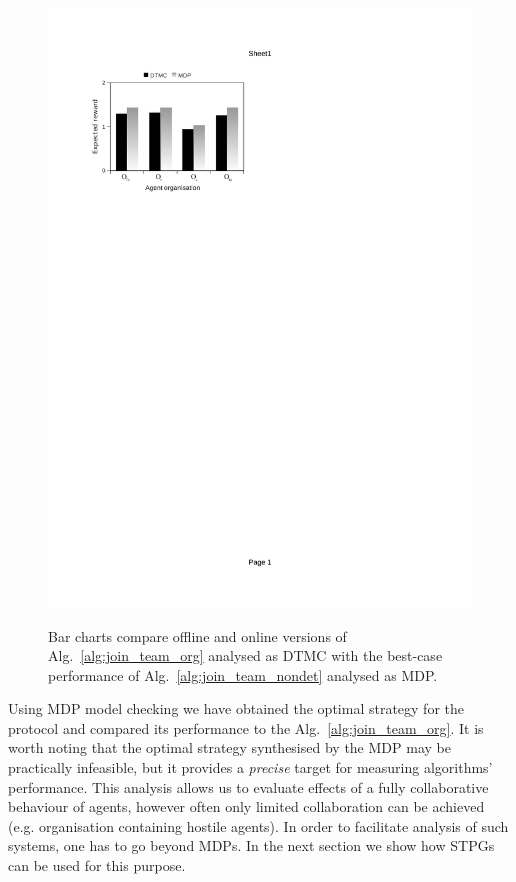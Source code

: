 \documentclass{llncs}
\begin{document}
\begin{figure}[H]
{{\includegraphics[clip=true, trim=63 581.5 320 80, scale=0.77]{images/w2_mdp_online}
}}
\caption{Bar charts compare offline and online versions of Alg.~\ref{alg:join_team_org} analysed as DTMC with the best-case performance of Alg.~\ref{alg:join_team_nondet} analysed as MDP. }
\label{fig:bar_chart_mdp}
\end{figure}




Using MDP model checking we have obtained the optimal strategy for the protocol and compared its performance to the Alg.~\ref{alg:join_team_org}. It is worth noting that the optimal strategy synthesised by the MDP may be practically infeasible, but it provides a \emph{precise} target for measuring algorithms' performance. This analysis allows us to evaluate effects of a fully collaborative behaviour of agents, however often only limited collaboration can be achieved (e.g. organisation containing hostile agents). In order to facilitate analysis of such systems, one has to go beyond MDPs. In the next section we show how STPGs can be used for this purpose.
\end{document}
